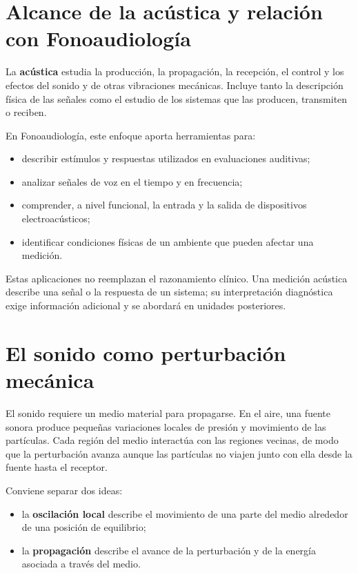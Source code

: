 \section{Alcance de la acústica y relación con Fonoaudiología}
\label{sec:u1-alcance}

La \textbf{acústica} estudia la producción, la propagación, la recepción, el control y los efectos del sonido y de otras vibraciones mecánicas. Incluye tanto la descripción física de las señales como el estudio de los sistemas que las producen, transmiten o reciben.

En Fonoaudiología, este enfoque aporta herramientas para:

\begin{itemize}
    \item describir estímulos y respuestas utilizados en evaluaciones auditivas;
    \item analizar señales de voz en el tiempo y en frecuencia;
    \item comprender, a nivel funcional, la entrada y la salida de dispositivos electroacústicos;
    \item identificar condiciones físicas de un ambiente que pueden afectar una medición.
\end{itemize}

Estas aplicaciones no reemplazan el razonamiento clínico. Una medición acústica describe una señal o la respuesta de un sistema; su interpretación diagnóstica exige información adicional y se abordará en unidades posteriores.

\section{El sonido como perturbación mecánica}
\label{sec:u1-onda-mecanica}

El sonido requiere un medio material para propagarse. En el aire, una fuente sonora produce pequeñas variaciones locales de presión y movimiento de las partículas. Cada región del medio interactúa con las regiones vecinas, de modo que la perturbación avanza aunque las partículas no viajen junto con ella desde la fuente hasta el receptor.

Conviene separar dos ideas:

\begin{itemize}
    \item la \textbf{oscilación local} describe el movimiento de una parte del medio alrededor de una posición de equilibrio;
    \item la \textbf{propagación} describe el avance de la perturbación y de la energía asociada a través del medio.
\end{itemize}

